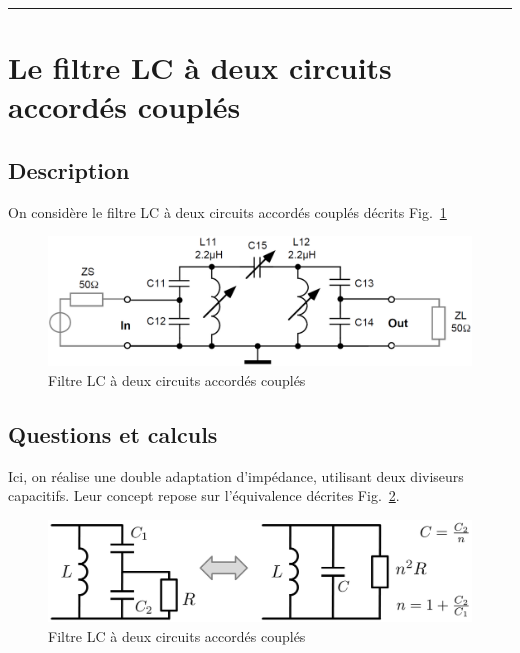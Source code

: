 \documentclass{article}
\begin{document}


\vspace{5pt}\hrule\vspace{2pt}


\vspace{20pt}







\section{Le filtre LC à deux circuits accordés couplés}

\subsection{Description}

On considère le filtre LC à deux circuits accordés couplés décrits Fig.~\ref{fig:LC2circuits}

\begin{figure}[h!]
	\centering
	\includegraphics[width=.7\textwidth]{LC2circuits}
	\caption{Filtre LC à deux circuits accordés couplés}
	\label{fig:LC2circuits}
\end{figure}



\subsection{Questions et calculs}



Ici, on réalise une double adaptation d'impédance, utilisant deux diviseurs capacitifs. Leur concept repose sur l'équivalence décrites Fig.~\ref{fig:capa_divider}.

\begin{figure}[h!]
	\centering
	\includegraphics[width=.7\textwidth]{capa_divider}
	\caption{Filtre LC à deux circuits accordés couplés}
	\label{fig:capa_divider}
\end{figure}
\end{document}
